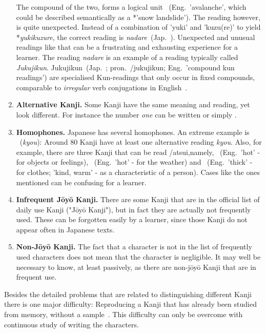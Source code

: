 \begin{enumerate}
        The compound of the two, forms a logical unit 
        ~(Eng.\ 'avalanche', which could be described semantically as a
        *'snow landslide'). The reading however, is quite unexpected. Instead of
        a combination of 'yuki' and 'kuzu(re)' to yield *\emph{yukikuzure},
        the correct reading is \emph{nadare}~(Jap.\ ).
        Unexpected and unusual readings like that can be a frustrating and 
        exhausting experience for a learner. %
        The reading \emph{nadare} is an example of a reading typically called
        \emph{Jukujikun}.
        Jukujikun~(Jap.\ ; pron.\ /jukujikun; 
        Eng.\ 'compound kun readings') are specialised Kun-readings that only 
        occur in fixed compounds, comparable to \emph{irregular} verb 
        conjugations in English~.
     
  \item \textbf{Alternative Kanji.} Some Kanji have the same meaning and reading,
        yet look different. For instance the number \emph{one} can be written
         or simply .

  \item \textbf{Homophones.} Japanese has several homophones. An extreme example
        is ~(\emph{kyou}): Around 80 Kanji have at least one 
        alternative reading \emph{kyou}. 
        Also, for example, there are three Kanji 
        that can be read /atsui,namely, 
        ~(Eng.\ 'hot' - for objects or feelings), 
        ~(Eng.\ 'hot' - for the weather) and 
        ~(Eng.\ 'thick' - for clothes; 'kind, warm' - as a 
        characteristic of a person). Cases like the ones mentioned can be 
        confusing for a learner.

  \item \textbf{Infrequent Jōyō Kanji.} There are some Kanji that are in the 
        official list of daily use Kanji ("Jōyō Kanji"), 
        but in fact they are actually not frequently used. These can be 
        forgotten easily by a learner, since those Kanji do 
        not appear often in Japanese texts.

  \item \textbf{Non-Jōyō Kanji.} The fact that a character is not in the list 
        of frequently used characters does not mean that the character is 
        negligible. It may well be necessary to know, at least passively,
        as there are non-jōyō Kanji that are in frequent use.
\end{enumerate}
Besides the detailed problems that are related to distinguishing different Kanji 
there is one major difficulty:
Reproducing a Kanji that has already been studied from memory, without a
sample~. This difficulty can only be overcome with 
continuous study of writing the characters.

